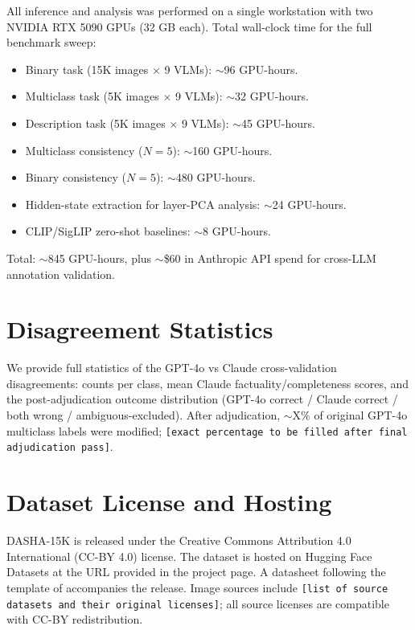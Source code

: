 \documentclass{article}
\newcommand{\bench}{\textsc{DASHA-15K}\xspace}
\begin{document}
All inference and analysis was performed on a single workstation with
two NVIDIA RTX 5090 GPUs (32 GB each). Total wall-clock time for the
full benchmark sweep:
\begin{itemize}\setlength{\itemsep}{1pt}
  \item Binary task (15K images $\times$ 9 VLMs): $\sim$96 GPU-hours.
  \item Multiclass task (5K images $\times$ 9 VLMs): $\sim$32 GPU-hours.
  \item Description task (5K images $\times$ 9 VLMs): $\sim$45 GPU-hours.
  \item Multiclass consistency ($N=5$): $\sim$160 GPU-hours.
  \item Binary consistency ($N=5$): $\sim$480 GPU-hours.
  \item Hidden-state extraction for layer-PCA analysis: $\sim$24 GPU-hours.
  \item CLIP/SigLIP zero-shot baselines: $\sim$8 GPU-hours.
\end{itemize}
Total: $\sim$845 GPU-hours, plus $\sim$\$60 in Anthropic API spend
for cross-LLM annotation validation.

\section{Disagreement Statistics}
\label{app:disagreement_stats}

We provide full statistics of the GPT-4o vs Claude cross-validation
disagreements: counts per class, mean Claude factuality/completeness
scores, and the post-adjudication outcome distribution (GPT-4o
correct / Claude correct / both wrong / ambiguous-excluded). After
adjudication, $\sim$X\% of original GPT-4o multiclass labels were
modified; \texttt{[exact percentage to be filled after final
adjudication pass]}.

\section{Dataset License and Hosting}
\label{app:license}

\bench is released under the Creative Commons Attribution 4.0
International (CC-BY 4.0) license. The dataset is hosted on
Hugging Face Datasets at the URL provided in the project page.
A datasheet following the
template of \citet{datasheets} accompanies the release. Image
sources include \texttt{[list of source datasets and their original
licenses]}; all source licenses are compatible with CC-BY
redistribution.
\end{document}
